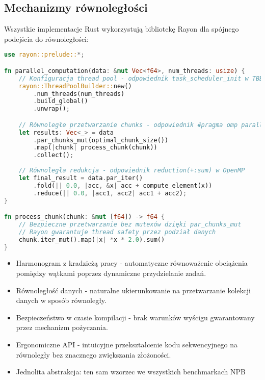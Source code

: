 \subsection{Mechanizmy równoległości}
Wszystkie implementacje Rust wykorzystują bibliotekę Rayon dla spójnego podejścia do równoległości:
\begin{lstlisting}[language=Rust, caption={Równoległość w benchmarkach NPB w języku Rust}, label={lst:rust_parallelism}]
use rayon::prelude::*;

fn parallel_computation(data: &mut Vec<f64>, num_threads: usize) {
    // Konfiguracja thread pool - odpowiednik task_scheduler_init w TBB
    rayon::ThreadPoolBuilder::new()
        .num_threads(num_threads)
        .build_global()
        .unwrap();

    // Równoległe przetwarzanie chunks - odpowiednik #pragma omp parallel for
    let results: Vec<_> = data
        .par_chunks_mut(optimal_chunk_size())
        .map(|chunk| process_chunk(chunk))
        .collect();
        
    // Równoległa redukcja - odpowiednik reduction(+:sum) w OpenMP
    let final_result = data.par_iter()
        .fold(|| 0.0, |acc, &x| acc + compute_element(x))
        .reduce(|| 0.0, |acc1, acc2| acc1 + acc2);
}

fn process_chunk(chunk: &mut [f64]) -> f64 {
    // Bezpieczne przetwarzanie bez mutexów dzięki par_chunks_mut
    // Rayon gwarantuje thread safety przez podział danych
    chunk.iter_mut().map(|x| *x * 2.0).sum()
}
\end{lstlisting}
\begin{itemize}
    \item Harmonogram z kradzieżą pracy  - automatyczne równoważenie obciążenia pomiędzy wątkami poprzez dynamiczne przydzielanie zadań.
    
    \item Równoległość danych - naturalne ukierunkowanie na przetwarzanie kolekcji danych w sposób równoległy.
    
    \item Bezpieczeństwo w czasie kompilacji - brak warunków wyścigu  gwarantowany przez mechanizm pożyczania.
    
    \item Ergonomiczne API - intuicyjne przekształcenie kodu sekwencyjnego na równoległy bez znacznego zwiększania złożoności.
    
    \item Jednolita abstrakcja: ten sam wzorzec we wszystkich benchmarkach NPB
  \end{itemize}
  

